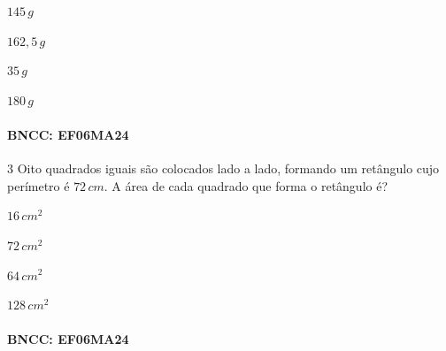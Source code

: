 \begin{escolha}
\item $145\,g$
\item $162,5\,g$
\item $35\,g$
\item $180\,g$
\end{escolha}

\paragraph{BNCC: EF06MA24 }


\num{3}  Oito quadrados iguais são colocados lado a lado, formando um
retângulo cujo perímetro é $72\,cm$. A área de cada quadrado que forma o
retângulo é?

\begin{escolha}
\item $16\,cm^2$
\item $72\,cm^2$
\item $64\,cm^2$
\item $128\,cm^2$
\end{escolha}

\paragraph{BNCC: EF06MA24 }

